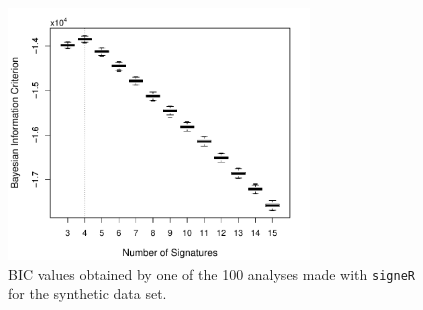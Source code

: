 \documentclass[11pt]{amsart}
\theoremstyle{definition}
\begin{document}
\begin{center}
\begin{figure}
  \includegraphics[width=8cm]{sfigs/BICs_Simulated_21bc_with_Opportunity}
  \caption{BIC values obtained by one of the 100 analyses made with
    \texttt{signeR} for the synthetic data set.}\label{fig:BICS}
\end{figure}
\end{center}
\vspace{-2cm}


\newpage
\end{document}
